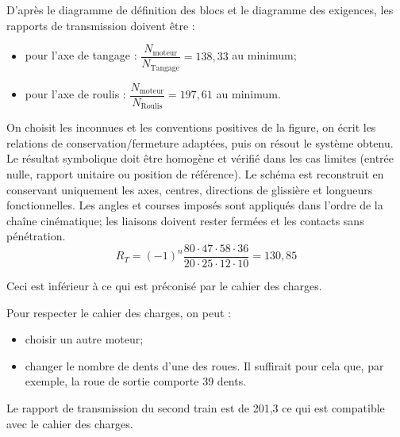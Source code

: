 \begin{corrigebox}
D'après le diagramme de définition des blocs et le diagramme des exigences, les rapports de transmission doivent être : 
\begin{itemize}
\item pour l'axe de tangage : $\dfrac{N_{\text{moteur}}}{N_{\text{Tangage}}}=138,33$ au minimum; 
\item pour l'axe de roulis :  $\dfrac{N_{\text{moteur}}}{N_{\text{Roulis}}}= 197,61$ au minimum.
\end{itemize}
On choisit les inconnues et les conventions positives de la figure,
        on écrit les relations de conservation/fermeture adaptées, puis on résout le
        système obtenu. Le résultat symbolique doit être homogène et vérifié dans les cas
        limites (entrée nulle, rapport unitaire ou position de référence).
Le schéma est reconstruit en conservant uniquement les axes, centres,
        directions de glissière et longueurs fonctionnelles. Les angles et courses imposés
        sont appliqués dans l'ordre de la chaîne cinématique; les liaisons doivent rester
        fermées et les contacts sans pénétration.
$$
R_T = (-1)^n \dfrac{80\cdot 47 \cdot 58 \cdot 36}{20\cdot 25\cdot 12 \cdot 10 } = 130,85
$$

Ceci est inférieur à ce qui est préconisé par le cahier des charges. 

Pour respecter le cahier des charges, on peut :
\begin{itemize}
\item choisir un autre moteur;
\item changer le nombre de dents d'une des roues. Il suffirait pour cela que,  par exemple, la roue de sortie comporte 39 dents. 
\end{itemize}
Le rapport de transmission du second train est de 201,3 ce qui est compatible avec le cahier des charges.
\end{corrigebox}
